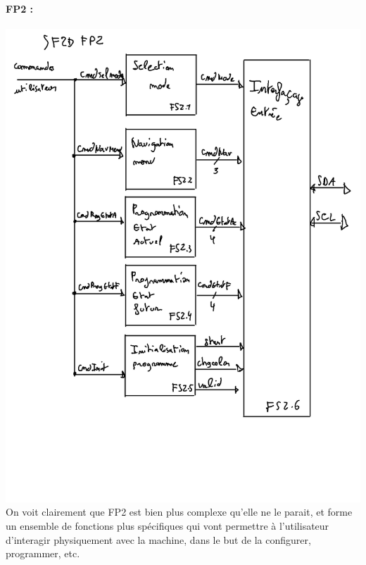 \documentclass[12pt]{article}
\begin{document}
	\paragraph{FP2 :}
	\includegraphics[width=\textwidth]{img/SF2DFP2}
	On voit clairement que FP2 est bien plus complexe qu'elle ne le parait, et forme un ensemble de fonctions plus spécifiques qui vont permettre à l'utilisateur d'interagir physiquement avec la machine, dans le but de la configurer, programmer, etc.
\end{document}
